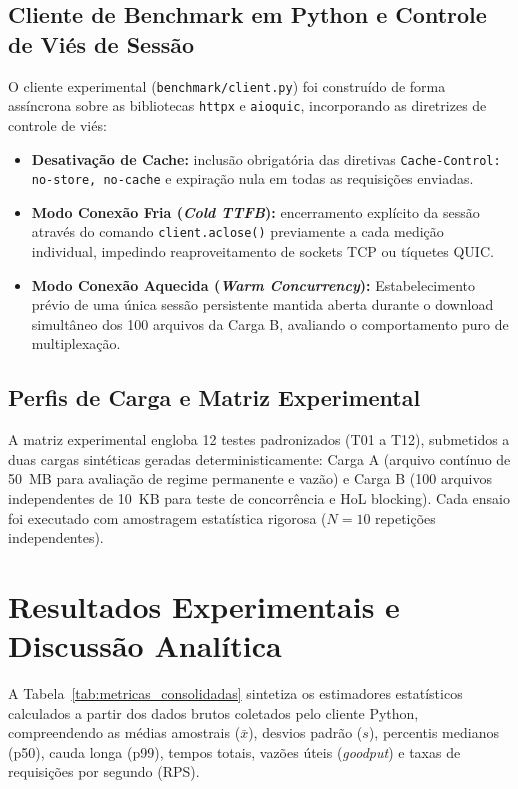 \documentclass[12pt]{article}
\begin{document}
\subsection{Cliente de Benchmark em Python e Controle de Viés de Sessão}
O cliente experimental (\texttt{benchmark/client.py}) foi construído de forma assíncrona sobre as bibliotecas \texttt{httpx} e \texttt{aioquic}, incorporando as diretrizes de controle de viés:
\begin{itemize}
    \item \textbf{Desativação de Cache:} inclusão obrigatória das diretivas \texttt{Cache-Control: no-store, no-cache} e expiração nula em todas as requisições enviadas.
    \item \textbf{Modo Conexão Fria (\textit{Cold TTFB}):} encerramento explícito da sessão através do comando \mbox{\texttt{client.aclose()}} previamente a cada medição individual, impedindo reaproveitamento de sockets TCP ou tíquetes QUIC.
    \item \textbf{Modo Conexão Aquecida (\textit{Warm Concurrency}):} Estabelecimento prévio de uma única sessão persistente mantida aberta durante o download simultâneo dos 100 arquivos da Carga B, avaliando o comportamento puro de multiplexação.
\end{itemize}

\subsection{Perfis de Carga e Matriz Experimental}
A matriz experimental engloba 12 testes padronizados (T01 a T12), submetidos a duas cargas sintéticas geradas deterministicamente: Carga A (arquivo contínuo de 50~MB para avaliação de regime permanente e vazão) e Carga B (100 arquivos independentes de 10~KB para teste de concorrência e HoL blocking). Cada ensaio foi executado com amostragem estatística rigorosa ($N = 10$ repetições independentes).

\section{Resultados Experimentais e Discussão Analítica}

A Tabela~\ref{tab:metricas_consolidadas} sintetiza os estimadores estatísticos calculados a partir dos dados brutos coletados pelo cliente Python, compreendendo as médias amostrais ($\bar{x}$), desvios padrão ($s$), percentis medianos (p50), cauda longa (p99), tempos totais, vazões úteis (\textit{goodput}) e taxas de requisições por segundo (RPS).
\end{document}
